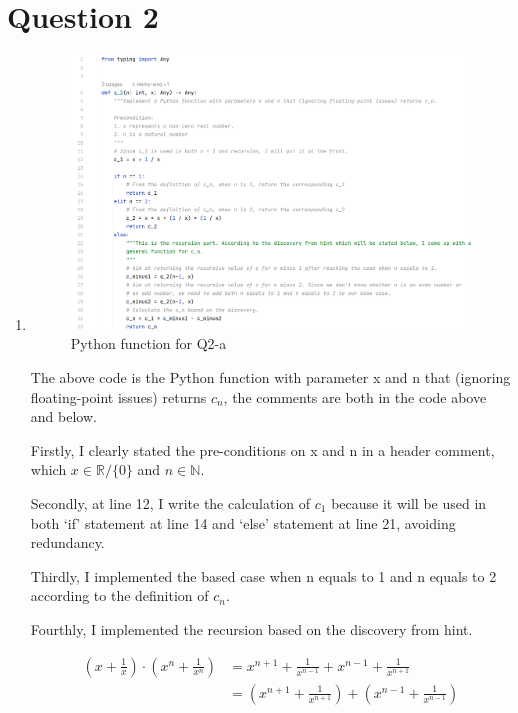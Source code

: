 \documentclass[12pt]{article}
\begin{document}
\section{Question 2}
\begin{enumerate}[label=(\alph*)]
    \item
\begin{figure}[h]
    \centering
    \includegraphics[width = 1.0\textwidth]{tex_pic/q2.png}
    \caption{Python function for Q2-a}
\end{figure}

\noindent The above code is the Python function with parameter x and n that (ignoring floating-point issues) returns $c_n$, the comments are both in the code above and below.

\noindent Firstly, I clearly stated the pre-conditions on x and n in a header comment, which $x \in \mathbb{R} / \{0\} $ and $n \in \mathbb{N}$.

\noindent Secondly, at line 12, I write the calculation of $c_1$ because it will be used in both `if' statement at line 14 and `else' statement at line 21, avoiding redundancy.

\noindent Thirdly, I implemented the based case when n equals to 1 and n equals to 2 according to the definition of $c_n$.

\noindent Fourthly, I implemented the recursion based on the discovery from hint.

\begin{align*}
    (x + \frac{1}{x}) \cdot (x^n + \frac{1}{x^n}) &= x^{n+1} + \frac{1}{x^{n-1}} + x^{n-1} + \frac{1}{x^{n+1}} \\
    &= (x^{n+1} + \frac{1}{x^{n+1}}) + (x^{n-1} + \frac{1}{x^{n-1}})
\end{align*}


\end{enumerate}
\end{document}
